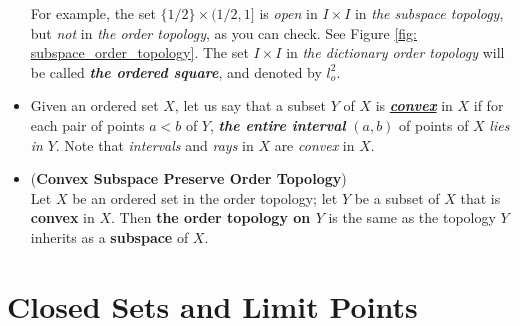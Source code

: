 \documentclass[11pt]{article}
\begin{document}
\begin{itemize}
\begin{remark}
For example, the set $\{1/2\} \times (1/2, 1]$ is \emph{open} in $I \times I$ in \emph{the subspace topology}, but \emph{not} in \emph{the order topology}, as you can check. See Figure \ref{fig: subspace_order_topology}. The set $I \times I$ in \emph{the dictionary order topology} will be called \emph{\textbf{the ordered square}}, and
denoted by $l_{o}^2$.
\end{remark}


\item \begin{definition}
Given an ordered set $X$, let us say that a subset $Y$ of $X$ is \underline{\emph{\textbf{convex}}} in $X$ if for each pair of points $a < b$ of $Y$, \emph{\textbf{the entire interval}} $(a, b)$ of points of $X$ \emph{lies in} $Y$. Note that \emph{intervals} and \emph{rays} in $X$ are \emph{convex} in $X$.
\end{definition}

\item \begin{proposition} (\textbf{Convex Subspace Preserve Order Topology})\citep{munkres2000topology}\\
Let $X$ be an ordered set in the order topology; let $Y$ be a subset of $X$ that is \textbf{convex} in $X$. Then \textbf{the order topology on $Y$} is the same as the topology $Y$ inherits as a \textbf{subspace} of $X$.
\end{proposition}
\end{itemize}

\section{Closed Sets and Limit Points}
\end{document}

